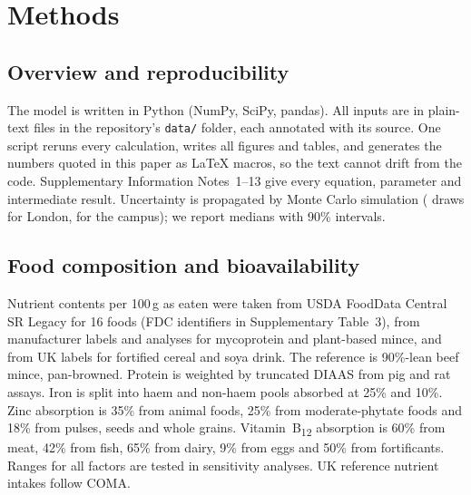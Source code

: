\documentclass[10pt]{article}
\begin{document}
\section{Methods}

\subsection{Overview and reproducibility}
The model is written in Python (NumPy, SciPy, pandas). All inputs are in plain-text files in the
repository's \texttt{data/} folder, each annotated with its source. One script reruns every
calculation, writes all figures and tables, and generates the numbers quoted in this paper as LaTeX
macros, so the text cannot drift from the code. Supplementary Information Notes~1--13 give every
equation, parameter and intermediate result. Uncertainty is propagated by Monte Carlo simulation
(\NMC{} draws for London, \NCampus{} for the campus); we report medians with 90\% intervals.

\subsection{Food composition and bioavailability}
Nutrient contents per 100\,g as eaten were taken from USDA FoodData Central SR Legacy\cite{usdafdc}
for 16 foods (FDC identifiers in Supplementary Table~3), from manufacturer labels and analyses for
mycoprotein\cite{finnigan2019,mayerlabba2022} and plant-based mince, and from UK labels for fortified
cereal and soya drink. The reference is 90\%-lean beef mince, pan-browned. Protein is weighted by
truncated DIAAS from pig and rat assays\cite{fao2013protein,bailey2020,mathai2017,han2020,nosworthy2017,rutherfurd2015,reynaud2021}.
Iron is split into haem and non-haem pools absorbed at 25\% and 10\%\cite{efsa2015iron,hurrell2010}. Zinc
absorption is 35\% from animal foods, 25\% from moderate-phytate foods and 18\% from pulses, seeds and
whole grains\cite{fao2004vitmin,izincg2004,efsa2014zinc}. Vitamin~B\textsubscript{12} absorption is 60\% from meat,
42\% from fish, 65\% from dairy, 9\% from eggs and 50\% from fortificants\cite{watanabe2007}. Ranges
for all factors are tested in sensitivity analyses. UK reference nutrient intakes follow COMA\cite{dh1991}.
\end{document}
